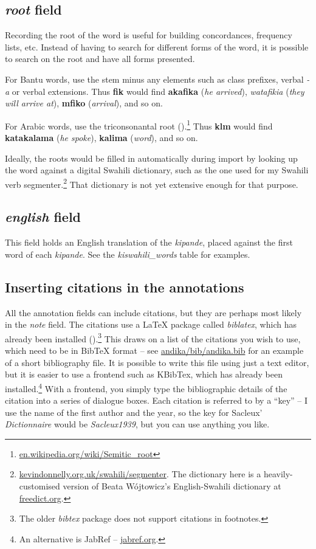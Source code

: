 \subsection{\textit{root} field}

Recording the root of the word is useful for building concordances, frequency lists, etc.  Instead of having to search for different forms of the word, it is possible to search on the root and have all forms presented.

For Bantu words, use the stem minus any elements such as class prefixes, verbal \textit{-a} or verbal extensions.  Thus \textbf{fik} would find \textbf{akafika} (\textit{he arrived}), \textit{watafikia} (\textit{they will arrive at}), \textbf{mfiko} (\textit{arrival}), and so on.

For Arabic words, use the triconsonantal root ().\footnote{\url{en.wikipedia.org/wiki/Semitic_root}}  Thus \textbf{klm} would find \textbf{katakalama} (\textit{he spoke}), \textbf{kalima} (\textit{word}), and so on.

Ideally, the roots would be filled in automatically during import by looking up the word against a digital Swahili dictionary, such as the one used for my Swahili verb segmenter.\footnote{\url{kevindonnelly.org.uk/swahili/segmenter}.  The dictionary here is a heavily-customised version of Beata Wójtowicz's English-Swahili dictionary at \url{freedict.org}.}  That dictionary is not yet extensive enough for that purpose.


\subsection{\textit{english} field}

This field holds an English translation of the \textit{kipande}, placed against the first word of each \textit{kipande}.  See the \textit{kiswahili_words} table for examples.


\subsection{Inserting citations in the annotations}

All the annotation fields can include citations, but they are perhaps most likely in the \textit{note} field.  The citations use a LaTeX package called \textit{biblatex}, which has already been installed ().\footnote{The older \textit{bibtex} package does not support citations in footnotes.}  This draws on a list of the citations you wish to use, which need to be in BibTeX format -- see \url{andika/bib/andika.bib} for an example of a short bibliography file.  It is possible to write this file using just a text editor, but it is easier to use a frontend such as KBibTex, which has already been installed.\footnote{An alternative is JabRef -- \url{jabref.org}.}  With a frontend, you simply type the bibliographic details of the citation into a series of dialogue boxes.  Each citation is referred to by a ``key'' -- I use the name of the first author and the year, so the key for Sacleux' \textit{Dictionnaire} would be \textit{Sacleux1939}, but you can use anything you like.


